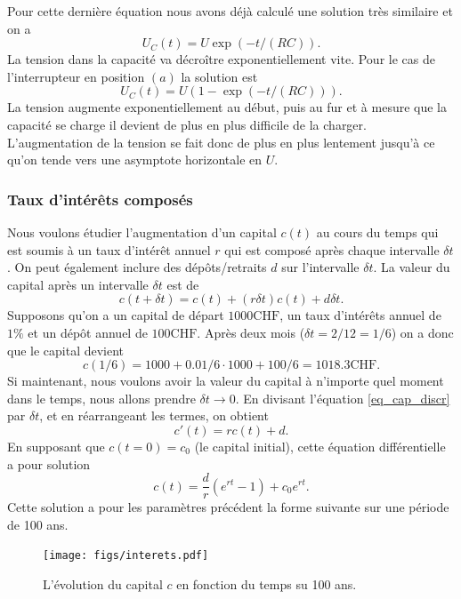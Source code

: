 \documentclass[a4paper,12pt]{book}
\begin{document}
Pour cette dernière équation nous avons déjà calculé une solution très similaire et on a
\begin{equation}
 U_C(t)=U\exp(-t/(RC)).
\end{equation}
La tension dans la capacité va décroître exponentiellement vite.
Pour le cas de l'interrupteur en position $(a)$ la solution est 
\begin{equation}
 U_C(t)=U(1-\exp(-t/(RC))).
\end{equation}
La tension augmente exponentiellement au début, puis au fur et à mesure que la capacité se charge il devient de plus en plus difficile 
de la charger. L'augmentation de la tension se fait donc de plus en plus lentement jusqu'à ce qu'on tende vers une asymptote horizontale
en $U$.

\subsubsection{Taux d'intérêts composés}

Nous voulons étudier l'augmentation d'un capital $c(t)$ au cours du temps qui est soumis à un 
taux d'intérêt annuel $r$ qui est composé après chaque intervalle $\delta t$. On
peut également inclure des dépôts/retraits $d$ sur l'intervalle $\delta t$.
La valeur du capital après un intervalle $\delta t$ est de
\begin{equation}
 c(t+\delta t)=c(t)+(r\delta t )c(t)+d\delta t.\label{eq_cap_discr}
\end{equation}
Supposons qu'on a un capital de départ $1000 \mathrm{CHF}$, un taux d'intérêts annuel de 
$1\%$ et un dépôt annuel de $100\mathrm{CHF}$. Après deux mois ($\delta t=2/12=1/6$)
on a donc que le capital devient
\begin{equation}
 c(1/6)=1000+0.01/6\cdot 1000 +100/6=1018.3\mathrm{CHF}.
\end{equation}
Si maintenant, nous voulons avoir la valeur du capital à n'importe quel moment dans le
temps, nous allons prendre $\delta t\rightarrow 0$. En divisant l'équation
\eqref{eq_cap_discr} par $\delta t$, et en réarrangeant les termes, on obtient
\begin{equation}
 c'(t)=rc(t)+d.
\end{equation}
En supposant que $c(t=0)=c_0$ (le capital initial), cette équation différentielle a pour solution
\begin{equation}
 c(t)=\frac{d}{r}(e^{rt}-1)+c_0e^{r t}.
\end{equation}
Cette solution a pour les paramètres précédent la forme suivante sur une période de 100 ans.
\begin{figure}[htp]
\begin{center}
\texttt{[image: figs/interets.pdf]}
\end{center}
\caption{L'évolution du capital $c$ en fonction du temps su 100 ans.}\label{fig_interets}
\end{figure}
\end{document}
